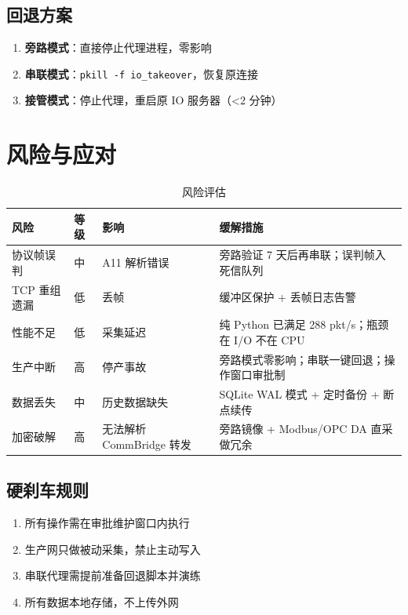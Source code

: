 \documentclass[12pt,a4paper]{ctexart}
\newcommand{\code}[1]{\texttt{\small #1}}
\begin{document}
\subsection{回退方案}

\begin{enumerate}[leftmargin=*]
  \item \textbf{旁路模式}：直接停止代理进程，零影响
  \item \textbf{串联模式}：\code{pkill -f io\_takeover}，恢复原连接
  \item \textbf{接管模式}：停止代理，重启原 IO 服务器（<2 分钟）
\end{enumerate}

\section{风险与应对}

\begin{table}[H]\centering
\caption{风险评估}
\begin{tabular}{p{2.5cm} p{1.5cm} p{3cm} p{5cm}}
\toprule
\textbf{风险} & \textbf{等级} & \textbf{影响} & \textbf{缓解措施} \\
\midrule
协议帧误判 & 中 & A11 解析错误 & 旁路验证 7 天后再串联；误判帧入死信队列 \\
TCP 重组遗漏 & 低 & 丢帧 & 缓冲区保护 + 丢帧日志告警 \\
性能不足 & 低 & 采集延迟 & 纯 Python 已满足 288 pkt/s；瓶颈在 I/O 不在 CPU \\
生产中断 & 高 & 停产事故 & 旁路模式零影响；串联一键回退；操作窗口审批制 \\
数据丢失 & 中 & 历史数据缺失 & SQLite WAL 模式 + 定时备份 + 断点续传 \\
加密破解 & 高 & 无法解析 CommBridge 转发 & 旁路镜像 + Modbus/OPC DA 直采做冗余 \\
\bottomrule
\end{tabular}
\end{table}

\subsection{硬刹车规则}

\begin{enumerate}[leftmargin=*]
  \item 所有操作需在审批维护窗口内执行
  \item 生产网只做被动采集，禁止主动写入
  \item 串联代理需提前准备回退脚本并演练
  \item 所有数据本地存储，不上传外网
\end{enumerate}
\end{document}
